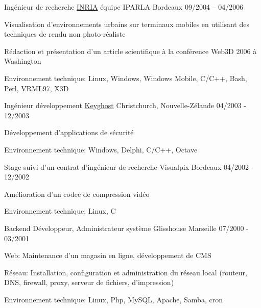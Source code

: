 \begin{cventries}
  \cventry
    {Ingénieur de recherche}
    {\href{https://www.inria.fr/}{INRIA} équipe IPARLA}
    {Bordeaux}
    {09/2004 – 04/2006}
    {
      \begin{cvitems}
        \item {Visualisation d'environnements urbains sur terminaux mobiles en
            utilisant des techniques de rendu non photo-réaliste}
        \item {Rédaction et présentation d'un article scientifique à la
            conférence Web3D 2006 à Washington}
        \item {Environnement technique: Linux, Windows, Windows Mobile, C/C++,
            Bash, Perl, VRML97, X3D}
      \end{cvitems}
    }

  \cventry
    {Ingénieur développement}
    {\href{https://www.keyghost.com/}{Keyghost}}
    {Christchurch, Nouvelle-Zélande}
    {04/2003 - 12/2003}
    {
      \begin{cvitems}
        \item {Développement d'applications de sécurité}
		\item {Environnement technique: Windows, Delphi, C/C++, Octave}
      \end{cvitems}
    }

  \cventry
    {Stage suivi d'un contrat d'ingénieur de recherche}
    {Visualpix}
    {Bordeaux}
    {04/2002 - 12/2002}
    {
      \begin{cvitems}
        \item {Amélioration d'un codec de compression vidéo}
        \item {Environnement technique: Linux, C}
      \end{cvitems}
    }

  \cventry
    {Backend Développeur, Administrateur système}
    {Glisshouse}
    {Marseille}
    {07/2000 - 03/2001}
    {
      \begin{cvitems}
        \item {Web: Maintenance d'un magasin en ligne, développement de CMS}
        \item {Réseau: Installation, configuration et administration du réseau
            local (routeur, DNS, firewall, proxy, serveur de fichiers,
            d'impression)}
        \item {Environnement technique: Linux, Php, MySQL, Apache, Samba, cron}
      \end{cvitems}
    }

\end{cventries}
